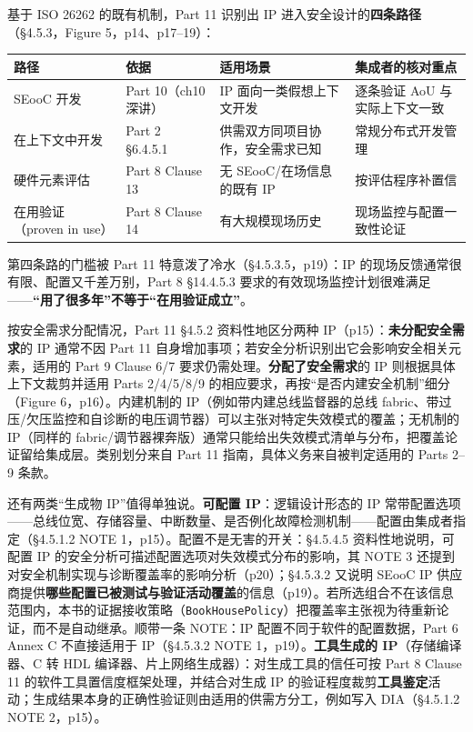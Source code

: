 基于 ISO 26262 的既有机制，Part 11 识别出 IP 进入安全设计的\textbf{四条路径}（§4.5.3，Figure 5，p14、p17–19）：

\begin{center}
\begingroup\small
\setlength{\tabcolsep}{4pt}
\begin{tabularx}{\linewidth}{@{}XXXX@{}}
\toprule
路径 & 依据 & 适用场景 & 集成者的核对重点 \\
\midrule
SEooC 开发 & Part 10（ch10 深讲） & IP 面向一类假想上下文开发 & 逐条验证 AoU 与实际上下文一致 \\
在上下文中开发 & Part 2 §6.4.5.1 & 供需双方同项目协作，安全需求已知 & 常规分布式开发管理 \\
硬件元素评估 & Part 8 Clause 13 & 无 SEooC/在场信息的既有 IP & 按评估程序补置信 \\
在用验证（proven in use） & Part 8 Clause 14 & 有大规模现场历史 & 现场监控与配置一致性论证 \\
\bottomrule
\end{tabularx}
\endgroup
\end{center}

第四条路的门槛被 Part 11 特意泼了冷水（§4.5.3.5，p19）：IP 的现场反馈通常很有限、配置又千差万别，Part 8 §14.4.5.3 要求的有效现场监控计划很难满足——\textbf{“用了很多年”不等于“在用验证成立”}。

按安全需求分配情况，Part 11 §4.5.2 资料性地区分两种 IP（p15）：\textbf{未分配安全需求}的 IP 通常不因 Part 11 自身增加事项；若安全分析识别出它会影响安全相关元素，适用的 Part 9 Clause 6/7 要求仍需处理。\textbf{分配了安全需求}的 IP 则根据具体上下文裁剪并适用 Parts 2/4/5/8/9 的相应要求，再按“是否内建安全机制”细分（Figure 6，p16）。内建机制的 IP（例如带内建总线监督器的总线 fabric、带过压/欠压监控和自诊断的电压调节器）可以主张对特定失效模式的覆盖；无机制的 IP（同样的 fabric/调节器裸奔版）通常只能给出失效模式清单与分布，把覆盖论证留给集成层。类别划分来自 Part 11 指南，具体义务来自被判定适用的 Parts 2–9 条款。

还有两类“生成物 IP”值得单独说。\textbf{可配置 IP}：逻辑设计形态的 IP 常带配置选项——总线位宽、存储容量、中断数量、是否例化故障检测机制——配置由集成者指定（§4.5.1.2 NOTE 1，p15）。配置不是无害的开关：§4.5.4.5 资料性地说明，可配置 IP 的安全分析可描述配置选项对失效模式分布的影响，其 NOTE 3 还提到对安全机制实现与诊断覆盖率的影响分析（p20）；§4.5.3.2 又说明 SEooC IP 供应商提供\textbf{哪些配置已被测试与验证活动覆盖}的信息（p19）。若所选组合不在该信息范围内，本书的证据接收策略（\nolinkurl{BookHousePolicy}）把覆盖率主张视为待重新论证，而不是自动继承。顺带一条 NOTE：IP 配置不同于软件的配置数据，Part 6 Annex C 不直接适用于 IP（§4.5.3.2 NOTE 1，p19）。\textbf{工具生成的 IP}（存储编译器、C 转 HDL 编译器、片上网络生成器）：对生成工具的信任可按 Part 8 Clause 11 的软件工具置信度框架处理，并结合对生成 IP 的验证程度裁剪\textbf{工具鉴定}活动；生成结果本身的正确性验证则由适用的供需方分工，例如写入 DIA（§4.5.1.2 NOTE 2，p15）。

